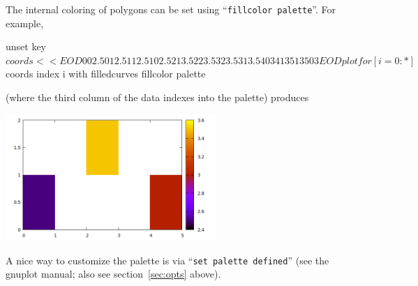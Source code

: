 \documentclass{article}
\begin{document}
\medskip

The internal coloring of polygons can be set using ``\texttt{fillcolor
  palette}''. For example,
\begin{code}
unset key
$coords << EOD
0 0 2.5
0 1 2.5
1 1 2.5
1 0 2.5

2 1 3.5
2 2 3.5
3 2 3.5
3 1 3.5

4 0 3
4 1 3
5 1 3
5 0 3
EOD
plot for [i=0:*] $coords index i with filledcurves fillcolor palette
\end{code}
(where the third column of the data indexes into the palette) produces
\begin{center}
  \includegraphics[width=0.6\textwidth]{squares}
\end{center}

A nice way to customize the palette is via ``\texttt{set
  palette defined}'' (see the \textsf{gnuplot} manual; also see
section~\ref{sec:opts} above).
\end{document}
